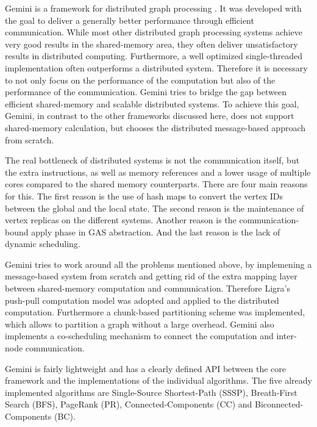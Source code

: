 
Gemini is a framework for distributed graph processing \cite{Gemini}.
It was developed with the goal to deliver a generally better performance through efficient communication.
While most other distributed graph processing systems achieve very good results in the shared-memory area, they often deliver unsatisfactory results in distributed computing.
Furthermore, a well optimized single-threaded implementation often outperforms a distributed system.
Therefore it is necessary to not only focus on the performance of the computation but also of the performance of the communication.
Gemini tries to bridge the gap between efficient shared-memory and scalable distributed systems.
To achieve this goal, Gemini, in contrast to the other frameworks discussed here, does not support shared-memory calculation, but chooses the distributed message-based approach from scratch.

The real bottleneck of distributed systems is not the communication itself, but the extra instructions, as well as memory references and a lower usage of multiple cores compared to the shared memory counterparts.
There are four main reasons for this.
The first reason is the use of hash maps to convert the vertex IDs between the global and the local state.
The second reason is the maintenance of vertex replicas on the different systems.
Another reason is the communication-bound apply phase in GAS abstraction.
And the last reason is the lack of dynamic scheduling.

Gemini tries to work around all the problems mentioned above, by implemening a message-based system from scratch and getting rid of the extra mapping layer between shared-memory computation and communication.
Therefore Ligra's push-pull computation model was adopted and applied to the distributed computation.
Furthermore a chunk-based partitioning scheme was implemented, which allows to partition a graph without a large overhead.
Gemini also implements a co-scheduling mechanism to connect the computation and inter-node communication.

Gemini is fairly lightweight and has a clearly defined API between the core framework and the implementations of the individual algorithms. The five already implemented algorithms are Single-Source Shortest-Path (SSSP), Breath-First Search (BFS), PageRank (PR), Connected-Components (CC) and Biconnected-Components (BC).

